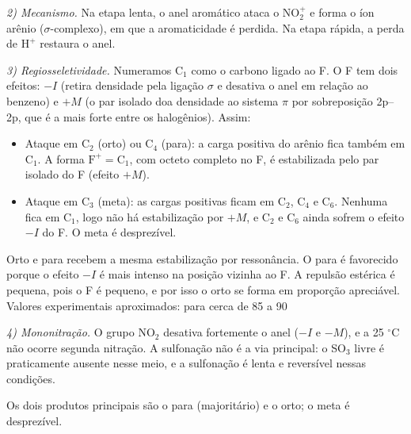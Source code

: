 \documentclass{article}%
\begin{document}
\noindent\emph{2) Mecanismo.} Na etapa lenta, o anel aromático ataca o $\text{NO}_2^{+}$ e forma o íon arênio ($\sigma$-complexo), em que a aromaticidade é perdida. Na etapa rápida, a perda de $\text{H}^{+}$ restaura o anel.

\noindent\emph{3) Regiosseletividade.} Numeramos $\text{C}_1$ como o carbono ligado ao F. O F tem dois efeitos: $-I$ (retira densidade pela ligação $\sigma$ e desativa o anel em relação ao benzeno) e $+M$ (o par isolado doa densidade ao sistema $\pi$ por sobreposição 2p–2p, que é a mais forte entre os halogênios). Assim:
\begin{itemize}
\item Ataque em $\text{C}_2$ (orto) ou $\text{C}_4$ (para): a carga positiva do arênio fica também em $\text{C}_1$. A forma $\text{F}^{+}{=}\text{C}_1$, com octeto completo no F, é estabilizada pelo par isolado do F (efeito $+M$).
\item Ataque em $\text{C}_3$ (meta): as cargas positivas ficam em $\text{C}_2$, $\text{C}_4$ e $\text{C}_6$. Nenhuma fica em $\text{C}_1$, logo não há estabilização por $+M$, e $\text{C}_2$ e $\text{C}_6$ ainda sofrem o efeito $-I$ do F. O meta é desprezível.
\end{itemize}
Orto e para recebem a mesma estabilização por ressonância. O para é favorecido porque o efeito $-I$ é mais intenso na posição vizinha ao F. A repulsão estérica é pequena, pois o F é pequeno, e por isso o orto se forma em proporção apreciável. Valores experimentais aproximados: para cerca de 85 a 90 %

\noindent\emph{4) Mononitração.} O grupo $\text{NO}_2$ desativa fortemente o anel ($-I$ e $-M$), e a 25 $^\circ$C não ocorre segunda nitração. A sulfonação não é a via principal: o SO$_3$ livre é praticamente ausente nesse meio, e a sulfonação é lenta e reversível nessas condições.

\noindent Os dois produtos principais são o para (majoritário) e o orto; o meta é desprezível.
\end{document}
